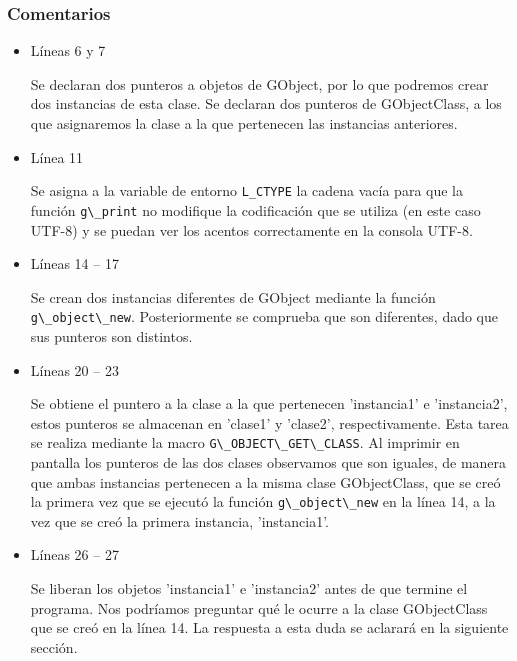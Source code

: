 \subsubsection{Comentarios}
\begin{itemize}
\item Líneas 6 y 7\par
  Se declaran dos punteros a objetos de \textsf{GObject}, por lo que podremos crear dos
  instancias de esta clase.
  Se declaran dos punteros de \textsf{GObjectClass}, a los que asignaremos la clase a la que pertenecen
  las instancias anteriores.
\item Línea 11\par
  Se asigna a la variable de entorno \texttt{L\_CTYPE} la cadena vacía para que la función
  \passthrough{\lstinline!g\_print!} no modifique la codificación que se utiliza (en este caso UTF-8)
  y se puedan ver los acentos correctamente en la consola UTF-8.
\item Líneas 14 -- 17\par
  Se crean dos instancias diferentes de \textsf{GObject} mediante la función 
  \passthrough{\lstinline!g\_object\_new!}. Posteriormente se comprueba que son diferentes, dado que
  sus punteros son distintos.
\item Líneas 20 -- 23\par
  Se obtiene el puntero a la clase a la que pertenecen 'instancia1' e 'instancia2', estos punteros se
  almacenan en 'clase1' y 'clase2', respectivamente. Esta tarea se realiza mediante la macro
  \passthrough{\lstinline!G\_OBJECT\_GET\_CLASS!}. Al imprimir en pantalla los punteros de las
  dos clases observamos que son iguales, de manera que ambas instancias pertenecen a la misma
  clase \textsf{GObjectClass}, que se creó la primera vez que se ejecutó la función
  \passthrough{\lstinline!g\_object\_new!} en la línea 14, a la vez que se creó la primera instancia,
  'instancia1'.
\item Líneas 26 -- 27\par
  Se liberan los objetos 'instancia1' e 'instancia2' antes de que termine el programa. Nos podríamos
  preguntar qué le ocurre a la clase \textsf{GObjectClass} que se creó en la línea 14. La respuesta a
  esta duda se aclarará en la siguiente sección.
\end{itemize}

